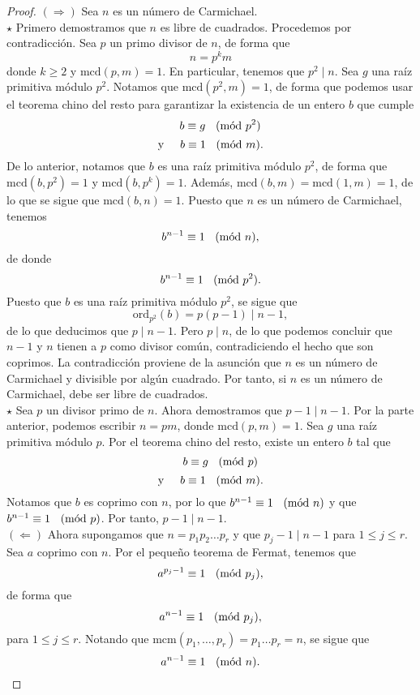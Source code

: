 \documentclass{article}
\theoremstyle{definition}
\newcommand{\Mod}[1]{\ \hspace{0.2cm} (\mathrm{m\acute{o}d}\ #1)}
\begin{document}
\begin{proof}
$(\Rightarrow)$	 Sea $n$ es un número de Carmichael. \\

$\star$ Primero demostramos  que $n$ es libre de cuadrados. Procedemos por contradicción. 
Sea $p$ un primo divisor de $n$, de forma que
$$ n = p^{k} m $$
donde $k\geq 2$ y $\text{mcd}(p, m) = 1$. En particular, tenemos que $p^{2} \mid n.$ Sea $g$ una raíz primitiva módulo $p^2$. Notamos que $\text{mcd}(p^2, m) = 1$, de forma que podemos usar el teorema chino del resto para garantizar la existencia de un entero $b$ que cumple
$$\hspace{0.6cm} b \equiv g \Mod{p^2} $$
$$\text{y} \hspace{0.5cm} b \equiv 1 \Mod{m} .$$
De lo anterior, notamos que $b$ es una raíz primitiva módulo $p^2$, de forma que $\text{mcd}(b, p^2) = 1$ y $\text{mcd}(b, p^k) = 1$. Además, $\text{mcd}(b, m) = \text{mcd}(1, m) = 1$, de lo que se sigue que $\text{mcd}(b, n) = 1.$ Puesto que $n$ es un número de Carmichael, tenemos
$$ b^{n-1} \equiv 1 \Mod{n}, $$
de donde
 $$ b^{n-1} \equiv 1 \Mod{p ^2}. $$
 Puesto que $b$ es una raíz primitiva módulo $p^2$, se sigue que $$ \text{ord}_{p^2}(b) =  p(p - 1) \mid n - 1, $$
 de lo que deducimos que $p \mid n -1$. Pero $p \mid n$, de lo que podemos concluir que $n - 1$ y $n$ tienen a $p$ como divisor común, contradiciendo el hecho que son coprimos. La contradicción proviene de la asunción que $n$ es un número de Carmichael y divisible por algún cuadrado. Por tanto, si $n$ es un número de Carmichael, debe ser libre de cuadrados. \\
 
 $\star$ Sea $p$ un divisor primo de $n$.  Ahora demostramos que $p-1 \mid n-1$. Por la parte anterior, podemos escribir $ n = pm $, donde $\text{mcd}(p, m) = 1.$ Sea $g$ una raíz primitiva módulo $p$. Por el teorema chino del resto, existe un entero $b$ tal que
 $$\hspace{0.6cm} b \equiv g \Mod{p} $$
 $$\text{y} \hspace{0.5cm} b \equiv 1 \Mod{m} .$$
 Notamos que $b$ es coprimo con $n$, por lo que $b^{n-1} \equiv 1 \Mod{n}$ y que  $b^{n-1}\equiv 1 \Mod{p}$. Por tanto, $p  - 1 \mid n - 1.$ \\
 
 $(\Leftarrow)$ Ahora supongamos que $n = p_{1} p_{2} \ldots p_{r}$ y que $p_{j} - 1 \mid n  - 1$ para $1 \leq j \leq r.$ Sea $a$ coprimo con $n$. Por el pequeño teorema de Fermat, tenemos que 
 $$ a^{p_{j} - 1} \equiv 1 \Mod{p_{j}}, $$
de forma que
 $$ a^{n - 1} \equiv 1 \Mod{p_{j}}, $$
 para $1 \leq j \leq r.$ Notando que $\text{mcm}(p_{1}, \ldots, p_{r}) = p_{1} \ldots p_{r} =  n$, se sigue que
 $$ a^{n-1} \equiv 1 \Mod{n}. $$
\end{proof}
\end{document}
